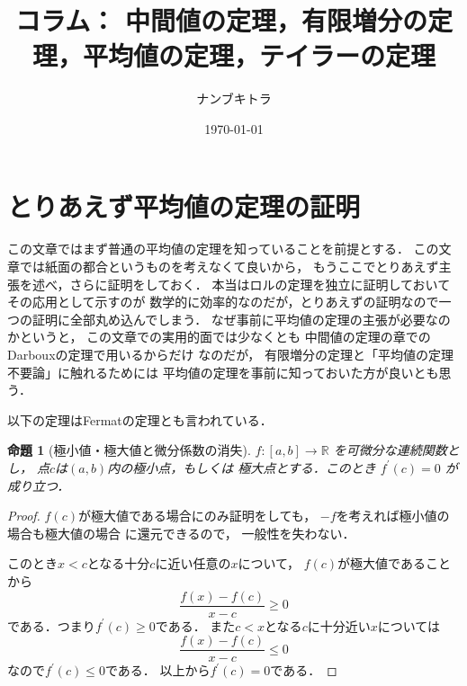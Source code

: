 \documentclass[leqno, a4paper, 12pt]{jsarticle}
\title{
コラム：
中間値の定理，有限増分の定理，平均値の定理，テイラーの定理
}
\author{ナンブキトラ}
\date{\today}
\newtheorem{prop}[thm]{命題}
\newcommand{\rr}{\mathbb{R}}
\newcommand{\bibun}[1]{#1^{\prime}}
\begin{document}
\maketitle


\section{とりあえず平均値の定理の証明}
この文章ではまず普通の平均値の定理を知っていることを前提とする．
この文章では紙面の都合というものを考えなくて良いから，
もうここでとりあえず主張を述べ，さらに証明をしておく．
本当はロルの定理を独立に証明しておいてその応用として示すのが
数学的に効率的なのだが，とりあえずの証明なので一つの証明に全部丸め込んでしまう．
なぜ事前に平均値の定理の主張が必要なのかというと，
この文章での実用的面では少なくとも
中間値の定理の章での
Darbouxの定理で用いるからだけ
なのだが，
有限増分の定理と「平均値の定理不要論」に触れるためには
平均値の定理を事前に知っておいた方が良いとも思う．

以下の定理はFermatの定理とも言われている．
\begin{prop}[極小値・極大値と微分係数の消失]\label{prop:vanish}
$f: [a, b]\to \rr$
を可微分な連続関数とし，
点$c$は$(a, b)$内の極小点，もしくは
極大点とする．このとき
$\bibun{f}(c)=0$
が成り立つ．
\end{prop}
\begin{proof}
$f(c)$が極大値である場合にのみ証明をしても，
$-f$を考えれば極小値の場合も極大値の場合
に還元できるので，
一般性を失わない．

このとき$x<c$となる十分$c$に近い任意の$x$について，
$f(c)$が極大値であることから
\[
\frac{f(x)-f(c)}{x-c}\ge  0
\]
である．つまり$\bibun{f}(c)\ge 0$である．
また$c<x$となる$c$に十分近い$x$については
\[
\frac{f(x)-f(c)}{x-c}\le 0
\]
なので$\bibun{f}(c)\le 0$である．
以上から$\bibun{f}(c)=0$である．
\end{proof}
\end{document}
